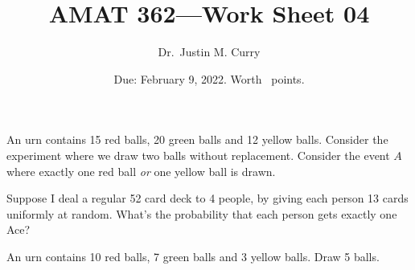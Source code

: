 \documentclass[addpoints,12pt]{exam}
\title{\vspace{-1in} AMAT 362---Work Sheet 04}
\date{Due: February 9, 2022. Worth \numpoints\ points.}
\author{Dr.~Justin M. Curry}
\begin{document}
\maketitle


\begin{questions}
\question[4]
An urn contains 15 red balls, 20 green balls and 12 yellow balls. Consider the experiment where we draw two balls without replacement. Consider the event $A$ where exactly one red ball {\em or} one yellow ball is drawn.
\noaddpoints
{}
\addpoints

\question[2] Suppose I deal a regular 52 card deck to 4 people, by giving each person 13 cards uniformly at random. What's the probability that each person gets exactly one Ace? 

\vspace{2in}

\question[2] An urn contains 10 red balls, 7 green balls and 3 yellow balls. Draw 5 balls. 
\noaddpoints
{}
\end{questions}
\end{document}
